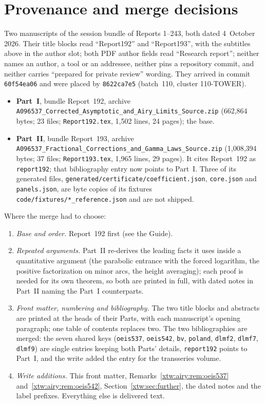 \documentclass[11pt]{article}
\theoremstyle{remark}\newtheorem{remark}[theorem]{Remark}
\newcommand{\file}[1]{\nolinkurl{#1}}
\begin{document}
\addtocounter{table}{-1}%
\endgroup

\section*{Provenance and merge decisions}\label{xtw:sec:provenance}
Two manuscripts of the session bundle of Reports 1--243, both dated
4~October 2026. Their title blocks read ``Report192'' and ``Report193'', with
the subtitles above in the author slot; both PDF author fields read
``Research report''; neither names an author, a tool or an addressee,
neither pins a repository commit, and neither carries ``prepared for private
review'' wording. They arrived in commit \texttt{60f54ea06} and were placed by
\texttt{8622ca7e5} (batch~110, cluster 110-TOWER).
\begin{itemize}
\item \textbf{Part~I}, bundle Report~192, archive
\file{A096537_Corrected_Asymptotic_and_Airy_Limits_Source.zip} (662,864 bytes;
23 files; \file{Report192.tex}, 1,502 lines, 24 pages); the base.
\item \textbf{Part~II}, bundle Report~193, archive
\file{A096537_Fractional_Corrections_and_Gamma_Laws_Source.zip} (1,008,394
bytes; 37 files; \file{Report193.tex}, 1,965 lines, 29 pages). It cites
Report~192 as \texttt{report192}; that bibliography entry now points to
Part~I. Three of its generated files,
\file{generated/certificate/coefficient.json}, \file{core.json} and
\file{panels.json}, are byte copies of its fixtures
\file{code/fixtures/*_reference.json} and are not shipped.
\end{itemize}
Where the merge had to choose:
\begin{enumerate}
\item \emph{Base and order.} Report~192 first (see the Guide).
\item \emph{Repeated arguments.} Part~II re-derives the leading facts it
uses inside a quantitative argument (the parabolic entrance with the forced
logarithm, the positive factorization on minor arcs, the height averaging);
each proof is needed for its own theorem, so both are printed in full, with
dated notes in Part~II naming the Part~I counterparts.
\item \emph{Front matter, numbering and bibliography.} The two title blocks
and abstracts are printed at the heads of their Parts, with each manuscript's
opening paragraph; one table of contents replaces two. The two
bibliographies are merged: the seven shared keys (\texttt{oeis537},
\texttt{oeis542}, \texttt{bv}, \texttt{poland}, \texttt{dlmf2},
\texttt{dlmf7}, \texttt{dlmf9}) are single entries keeping both Parts'
details, \texttt{report192} points to Part~I, and the write added the entry
for the transseries volume.
\item \emph{Write additions.} This front matter, Remarks~\ref{xtw:airy:rem:oeis537}
and~\ref{xtw:airy:rem:oeis542}, Section~\ref{xtw:sec:further}, the dated notes
and the label prefixes. Everything else is delivered text.
\end{enumerate}
\end{document}
